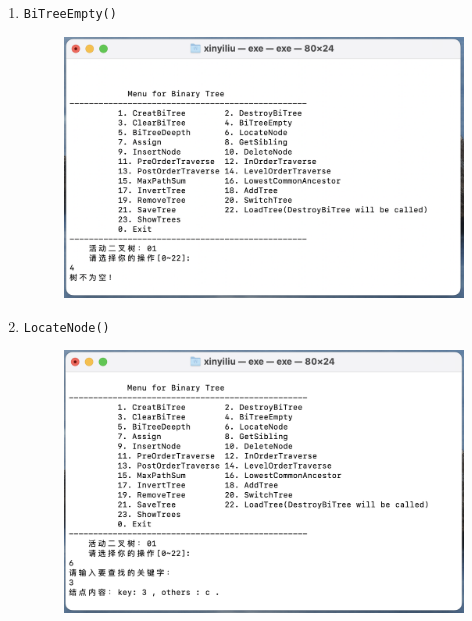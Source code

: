 \documentclass[supercite]{Experimental_Report}
\theoremstyle{definition}
\begin{document}
\begin{enumerate}
	\item \verb|BiTreeEmpty()|
		\begin{figure}[!htb]
			\includegraphics[width=0.8\linewidth]{images/img02/截屏2023-06-04 21.13.22.png}
		\end{figure}
		\FloatBarrier
	\newpage
	\item \verb|LocateNode()|
		\begin{figure}[!htb]
			\includegraphics[width=0.8\linewidth]{images/img02/截屏2023-06-04 21.13.38.png}
		\end{figure}
	\FloatBarrier
	

\end{enumerate}
\end{document}
